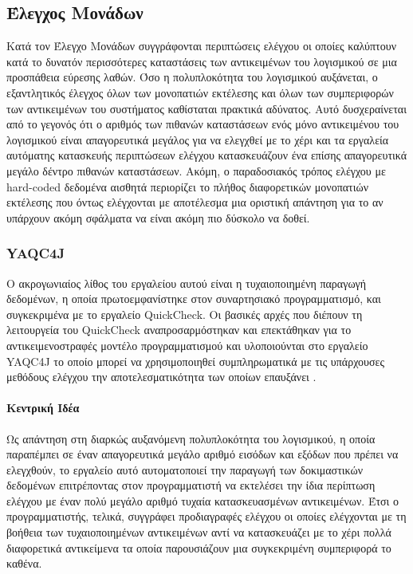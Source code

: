 \documentclass[12pt]{article}
\begin{document}
\subsection{Έλεγχος Μονάδων}
Κατά τον Έλεγχο Μονάδων συγγράφονται περιπτώσεις ελέγχου οι οποίες καλύπτουν κατά το δυνατόν περισσότερες καταστάσεις των αντικειμένων του λογισμικού σε μια προσπάθεια εύρεσης λαθών. Όσο η πολυπλοκότητα του λογισμικού αυξάνεται, ο εξαντλητικός έλεγχος όλων των μονοπατιών εκτέλεσης και όλων των συμπεριφορών των αντικειμένων του συστήματος καθίσταται πρακτικά αδύνατος. Αυτό δυσχεραίνεται από το γεγονός ότι ο αριθμός των πιθανών καταστάσεων ενός μόνο αντικειμένου του λογισμικού είναι απαγορευτικά μεγάλος για να ελεγχθεί με το χέρι και τα εργαλεία αυτόματης κατασκευής περιπτώσεων ελέγχου κατασκευάζουν ένα επίσης απαγορευτικά μεγάλο δέντρο πιθανών καταστάσεων. Ακόμη, ο παραδοσιακός τρόπος ελέγχου με hard-coded δεδομένα αισθητά περιορίζει το πλήθος διαφορετικών μονοπατιών εκτέλεσης που όντως ελέγχονται με αποτέλεσμα μια οριστική απάντηση για το αν υπάρχουν ακόμη σφάλματα να είναι ακόμη πιο δύσκολο να δοθεί.

\subsubsection{YAQC4J}

Ο ακρογωνιαίος λίθος του εργαλείου αυτού είναι η τυχαιοποιημένη παραγωγή δεδομένων, η οποία πρωτοεμφανίστηκε στον συναρτησιακό προγραμματισμό, και συγκεκριμένα με το εργαλείο QuickCheck. Οι βασικές αρχές που διέπουν τη λειτουργεία του QuickCheck αναπροσαρμόστηκαν και επεκτάθηκαν για το αντικειμενοστραφές μοντέλο προγραμματισμού και υλοποιούνται στο εργαλείο YAQC4J το οποίο μπορεί να χρησιμοποιηθεί συμπληρωματικά με τις υπάρχουσες μεθόδους ελέγχου την αποτελεσματικότητα των οποίων επαυξάνει \cite{andres}.

\paragraph{Κεντρική Ιδέα}

Ως απάντηση στη διαρκώς αυξανόμενη πολυπλοκότητα του λογισμικού, η οποία παραπέμπει σε έναν απαγορευτικά μεγάλο αριθμό εισόδων και εξόδων που πρέπει να ελεγχθούν, το εργαλείο αυτό αυτοματοποιεί την παραγωγή των δοκιμαστικών δεδομένων επιτρέποντας στον προγραμματιστή να εκτελέσει την ίδια περίπτωση ελέγχου με έναν πολύ μεγάλο αριθμό τυχαία κατασκευασμένων αντικειμένων. Έτσι ο προγραμματιστής, τελικά, συγγράφει προδιαγραφές ελέγχου οι οποίες ελέγχονται με τη βοήθεια των τυχαιοποιημένων αντικειμένων αντί να κατασκευάζει με το χέρι πολλά διαφορετικά αντικείμενα τα οποία παρουσιάζουν μια συγκεκριμένη συμπεριφορά το καθένα.
\end{document}
